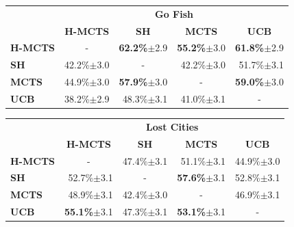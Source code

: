\documentclass[a4paper]{llncs}
\begin{document}
\begin{table}[ht]
\centering
\setlength{\tabcolsep}{10pt}

\begin{tabular}{@{}lrrrr@{}}
\toprule
& \multicolumn{4}{c}{\textbf{Go Fish}} \\
& \multicolumn{1}{c}{\textbf{H-MCTS}} & \multicolumn{1}{c}{\textbf{SH}} & \multicolumn{1}{c}{\textbf{MCTS}} & \multicolumn{1}{c}{\textbf{UCB}} \\[1mm] \cmidrule(l){2-5} 
\textbf{H-MCTS} & \multicolumn{1}{c}{-}		& \textbf{62.2\%}$\pm$2.9 	& \textbf{55.2\%}$\pm$3.0 	& \textbf{61.8\%}$\pm$2.9 	\\[.5mm] 
\textbf{SH}     & 42.2\%$\pm$3.0 			& \multicolumn{1}{c}{-} 	& 42.2\%$\pm$3.0 			& 51.7\%$\pm$3.1 			\\[.5mm] 
\textbf{MCTS}   & 44.9\%$\pm$3.0			& \textbf{57.9\%}$\pm$3.0 	& \multicolumn{1}{c}{-} 	& \textbf{59.0\%}$\pm$3.0 	\\[.5mm]
\textbf{UCB}	& 38.2\%$\pm$2.9			& 48.3\%$\pm$3.1			& 41.0\%$\pm$3.1 			& \multicolumn{1}{c}{-} 	\\[.5mm] 
\end{tabular}

\begin{tabular}{@{}lrrrr@{}}
\toprule
& \multicolumn{4}{c}{\textbf{Lost Cities}} \\
& \multicolumn{1}{c}{\textbf{H-MCTS}} & \multicolumn{1}{c}{\textbf{SH}} & \multicolumn{1}{c}{\textbf{MCTS}} & \multicolumn{1}{c}{\textbf{UCB}} \\ [1mm] \cmidrule(l){2-5} 
\textbf{H-MCTS} & \multicolumn{1}{c}{-}		& 47.4\%$\pm$3.1 			& 51.1\%$\pm$3.1		  	& 44.9\%$\pm$3.0 			\\[.5mm] 
\textbf{SH}     & 52.7\%$\pm$3.1 			& \multicolumn{1}{c}{-} 	& \textbf{57.6\%}$\pm$3.1  	& 52.8\%$\pm$3.1  			\\[.5mm] 
\textbf{MCTS}   & 48.9\%$\pm$3.1		 	& 42.4\%$\pm$3.0  			& \multicolumn{1}{c}{-} 	& 46.9\%$\pm$3.1  			\\[.5mm]
\textbf{UCB}	& \textbf{55.1\%}$\pm$3.1	& 47.3\%$\pm$3.1  			& \textbf{53.1\%}$\pm$3.1 	& \multicolumn{1}{c}{-} 	\\[.5mm]
\end{tabular}


\end{table}
\end{document}
